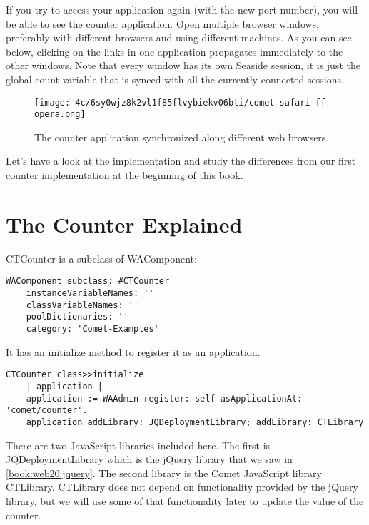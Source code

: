 \documentclass[a4paper,10pt,twoside]{book}
\newcommand{\ct}[1]{{\small\ttfamily\textup{#1}}}
\begin{document}
If you try to access your application again (with the new port number), you will be able to see the counter application. Open multiple browser windows, preferably with different browsers and using different machines. As you can see below, clicking on the links in one application propagates immediately to the other windows. Note that every window has its own Seaside session, it is just the global count variable that is synced with all the currently connected sessions.

\begin{figure}[h!tbp]
	\begin{center}
		\texttt{[image: 4c/6sy0wjz8k2vl1f85flvybiekv06bti/comet-safari-ff-opera.png]}
		\caption{The counter application synchronized along different web browsers.\label{book:web20:comet:gettingstarted:cometsafariffopera}}
	\end{center}
\end{figure}


Let's have a look at the implementation and study the differences from our first counter implementation at the beginning of this book.

\section{The Counter Explained}
\label{book:web20:comet:counterexplained}

 \ct{CTCounter} is a subclass of \ct{WAComponent}:

\begin{lstlisting}
WAComponent subclass: #CTCounter
    instanceVariableNames: ''
    classVariableNames: ''
    poolDictionaries: ''
    category: 'Comet-Examples'
\end{lstlisting}

It has an \ct{initialize} method to register it as an application.

\begin{lstlisting}
CTCounter class>>initialize
    | application |
    application := WAAdmin register: self asApplicationAt: 'comet/counter'.
    application addLibrary: JQDeploymentLibrary; addLibrary: CTLibrary
\end{lstlisting}

There are two JavaScript libraries included here. The first is \ct{JQDeploymentLibrary} which is the jQuery library that we saw in \autoref{book:web20:jquery}. The second library is the Comet JavaScript library \ct{CTLibrary}. \ct{CTLibrary} does not depend on functionality provided by the jQuery library, but we will use some of that functionality later to update the value of the counter.
\end{document}
